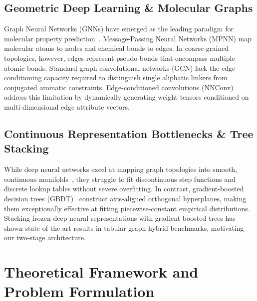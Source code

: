 \documentclass[11pt,a4paper]{article}
\begin{document}
\subsection{Geometric Deep Learning \& Molecular Graphs}
Graph Neural Networks (GNNs) have emerged as the leading paradigm for molecular property prediction~\cite{gilmer2017neural,wu2020comprehensive}. Message-Passing Neural Networks (MPNN) map molecular atoms to nodes and chemical bonds to edges. In coarse-grained topologies, however, edges represent pseudo-bonds that encompass multiple atomic bonds. Standard graph convolutional networks (GCN) lack the edge-conditioning capacity required to distinguish single aliphatic linkers from conjugated aromatic constraints. Edge-conditioned convolutions (NNConv)~\cite{gilmer2017neural,fey2019fast} address this limitation by dynamically generating weight tensors conditioned on multi-dimensional edge attribute vectors.

\subsection{Continuous Representation Bottlenecks \& Tree Stacking}
While deep neural networks excel at mapping graph topologies into smooth, continuous manifolds~\cite{schutt2017schnet,hu2020strategies}, they struggle to fit discontinuous step functions and discrete lookup tables without severe overfitting. In contrast, gradient-boosted decision trees (GBDT)~\cite{chen2016xgboost} construct axis-aligned orthogonal hyperplanes, making them exceptionally effective at fitting piecewise-constant empirical distributions. Stacking frozen deep neural representations with gradient-boosted trees has shown state-of-the-art results in tabular-graph hybrid benchmarks, motivating our two-stage architecture.

\section{Theoretical Framework and Problem Formulation}
\label{sec:formulation}
\end{document}
